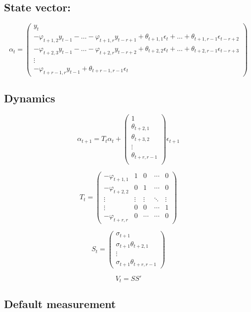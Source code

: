 \documentclass[
  letterpaper,
  DIV=11,
  numbers=noendperiod]{scrreprt}
\begin{document}
\subsection{State vector:}\label{state-vector-2}

\[ \alpha_t= \begin{pmatrix} y_t \\ 
-\varphi_{t+1,2} y_{t-1}-\dots-\varphi_{t+1,r} y_{t-r+1}+\theta_{t+1,1} \epsilon_t+ \dots + \theta_{t+1, r-1} \epsilon_{t-r+2}\\ -\varphi_{t+2,3} y_{t-1}-\dots-\varphi_{t+2,r} y_{t-r+2}+\theta_{t+2,2 }\epsilon_t+ \dots + \theta_{t+2,r-1} \epsilon_{t-r+3}\\ \vdots \\ 
-\varphi_{t+r-1,r} y_{t-1}+\theta_{t+r-1,r-1} \epsilon_{t}
\end{pmatrix}\]

\subsection{Dynamics}\label{dynamics-2}

\[ \alpha_{t+1} = T_t \alpha_t + \begin{pmatrix} 1 \\ \theta_{t+2,1} \\ \theta_{t+3,2} \\ \vdots \\  \theta_{t+r, r-1} \\ \end{pmatrix} \epsilon_{t+1} \]

\[ T_t = \begin{pmatrix}-\varphi_{t+1,1} &1 & 0 & \cdots & 0  \\
-\varphi_{t+2,2} & 0 & 1 & \cdots & 0\\ 
\vdots & \vdots & \vdots & \ddots & \vdots\\ 
\vdots & 0 & 0 & \cdots & 1\\
-\varphi_{t+r,r} & 0  & \cdots & \cdots &0 \end{pmatrix}\]

\[ S_t = \begin{pmatrix}\sigma_{t+1}\\ \sigma_{t+1} \theta_{t+2,1} \\ \vdots\\ \sigma_{t+1} \theta_{t+r,r-1} \end{pmatrix} \]

\[ V_t = S S' \]

\subsection{Default measurement}\label{default-measurement-2}
\end{document}
